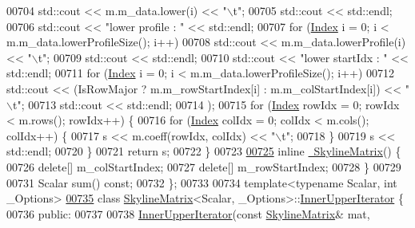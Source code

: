 \begin{DoxyCode}
00704             std::cout << m.m\_data.lower(i) << \textcolor{stringliteral}{"\(\backslash\)t"};
00705         std::cout << std::endl;
00706         std::cout << \textcolor{stringliteral}{"lower profile : "} << std::endl;
00707         \textcolor{keywordflow}{for} (\hyperlink{group___core___module_a554f30542cc2316add4b1ea0a492ff02}{Index} i = 0; i < m.m\_data.lowerProfileSize(); i++)
00708             std::cout << m.m\_data.lowerProfile(i) << \textcolor{stringliteral}{"\(\backslash\)t"};
00709         std::cout << std::endl;
00710         std::cout << \textcolor{stringliteral}{"lower startIdx : "} << std::endl;
00711         \textcolor{keywordflow}{for} (\hyperlink{group___core___module_a554f30542cc2316add4b1ea0a492ff02}{Index} i = 0; i < m.m\_data.lowerProfileSize(); i++)
00712             std::cout << (IsRowMajor ? m.m\_rowStartIndex[i] : m.m\_colStartIndex[i]) << \textcolor{stringliteral}{"\(\backslash\)t"};
00713         std::cout << std::endl;
00714         );
00715         \textcolor{keywordflow}{for} (\hyperlink{group___core___module_a554f30542cc2316add4b1ea0a492ff02}{Index} rowIdx = 0; rowIdx < m.rows(); rowIdx++) \{
00716             \textcolor{keywordflow}{for} (\hyperlink{group___core___module_a554f30542cc2316add4b1ea0a492ff02}{Index} colIdx = 0; colIdx < m.cols(); colIdx++) \{
00717                 s << m.coeff(rowIdx, colIdx) << \textcolor{stringliteral}{"\(\backslash\)t"};
00718             \}
00719             s << std::endl;
00720         \}
00721         \textcolor{keywordflow}{return} s;
00722     \}
00723 
\hyperlink{class_eigen_1_1_skyline_matrix_a456b254a757d26580b2c05fe270eaae7}{00725}     \textcolor{keyword}{inline} \hyperlink{class_eigen_1_1_skyline_matrix_a456b254a757d26580b2c05fe270eaae7}{~SkylineMatrix}() \{
00726         \textcolor{keyword}{delete}[] m\_colStartIndex;
00727         \textcolor{keyword}{delete}[] m\_rowStartIndex;
00728     \}
00729 
00731     Scalar sum() \textcolor{keyword}{const};
00732 \};
00733 
00734 \textcolor{keyword}{template}<\textcolor{keyword}{typename} Scalar, \textcolor{keywordtype}{int} \_Options>
\hyperlink{class_eigen_1_1_skyline_matrix_1_1_inner_upper_iterator}{00735} \textcolor{keyword}{class }\hyperlink{class_eigen_1_1_skyline_matrix}{SkylineMatrix}<Scalar, \_Options>::\hyperlink{class_eigen_1_1_skyline_matrix_1_1_inner_upper_iterator}{InnerUpperIterator} \{
00736 \textcolor{keyword}{public}:
00737 
00738     \hyperlink{class_eigen_1_1_skyline_matrix_1_1_inner_upper_iterator}{InnerUpperIterator}(\textcolor{keyword}{const} \hyperlink{class_eigen_1_1_skyline_matrix}{SkylineMatrix}& mat, 

\end{DoxyCode}
